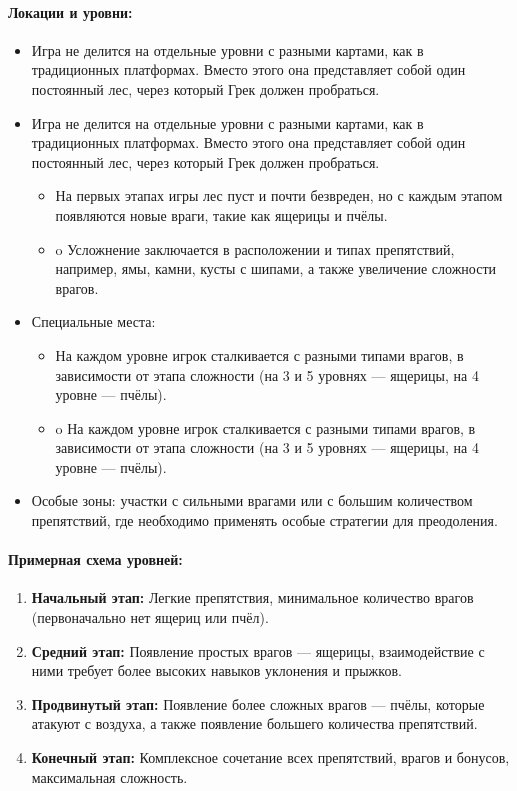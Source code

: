 \documentclass{article}
\begin{document}
\paragraph{Локации и уровни:}  
\begin{itemize}
    \item Игра не делится на отдельные уровни с разными картами, как в традиционных платформах. Вместо этого она представляет собой один постоянный лес, через который Грек должен пробраться.
    \item Игра не делится на отдельные уровни с разными картами, как в традиционных платформах. Вместо этого она представляет собой один постоянный лес, через который Грек должен пробраться.
    \begin{itemize}
        \item На первых этапах игры лес пуст и почти безвреден, но с каждым этапом появляются новые враги, такие как ящерицы и пчёлы.
        \item o	Усложнение заключается в расположении и типах препятствий, например, ямы, камни, кусты с шипами, а также увеличение сложности врагов.
    \end{itemize}
    \item Специальные места:
    \begin{itemize}
        \item На каждом уровне игрок сталкивается с разными типами врагов, в зависимости от этапа сложности (на 3 и 5 уровнях — ящерицы, на 4 уровне — пчёлы).
        \item o	На каждом уровне игрок сталкивается с разными типами врагов, в зависимости от этапа сложности (на 3 и 5 уровнях — ящерицы, на 4 уровне — пчёлы).
    \end{itemize}
    \item Особые зоны: участки с сильными врагами или с большим количеством препятствий, где необходимо применять особые стратегии для преодоления.
\end{itemize}

\paragraph{Примерная схема уровней:}
\begin{enumerate}[label=\arabic*.]
    \item \textbf{Начальный этап:} Легкие препятствия, минимальное количество врагов (первоначально нет ящериц или пчёл).
    \item \textbf{Средний этап:} Появление простых врагов — ящерицы, взаимодействие с ними требует более высоких навыков уклонения и прыжков.
    \item \textbf{Продвинутый этап:} Появление более сложных врагов — пчёлы, которые атакуют с воздуха, а также появление большего количества препятствий.
    \item \textbf{Конечный этап:} Комплексное сочетание всех препятствий, врагов и бонусов, максимальная сложность.
\end{enumerate}
\end{document}
